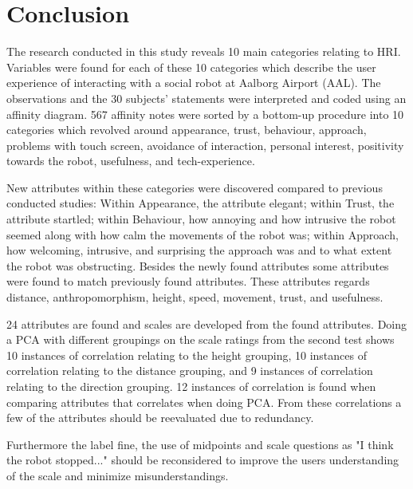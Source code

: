 \section{Conclusion}
\label{Conclusion}
%
The research conducted in this study reveals 10 main categories relating to HRI. Variables were found for each of these 10 categories which describe the user experience of interacting with a social robot at Aalborg Airport (AAL). The observations and the 30 subjects' statements were interpreted and coded using an affinity diagram. 567 affinity notes were sorted by a bottom-up procedure into 10 categories which revolved around appearance, trust, behaviour, approach, problems with touch screen, avoidance of interaction, personal interest, positivity towards the robot, usefulness, and tech-experience.

New attributes within these categories were discovered compared to previous conducted studies: Within Appearance, the attribute elegant; within Trust, the attribute startled; within Behaviour, how annoying and how intrusive the robot seemed along with how calm the movements of the robot was; within Approach, how welcoming, intrusive, and surprising the approach was and to what extent the robot was obstructing. Besides the newly found attributes some attributes were found to match previously found attributes. These attributes regards distance, anthropomorphism, height, speed, movement, trust, and usefulness.

24 attributes are found and scales are developed from the found attributes. Doing a PCA with different groupings on the scale ratings from the second test shows 10 instances of correlation relating to the height grouping, 10 instances of correlation relating to the distance grouping, and 9 instances of correlation relating to the direction grouping. 12 instances of correlation is found when comparing attributes that correlates when doing PCA. From these correlations a few of the attributes should be reevaluated due to redundancy.

Furthermore the label fine, the use of midpoints and scale questions as "I think the robot stopped..." should be reconsidered to improve the users understanding of the scale and minimize misunderstandings. 


